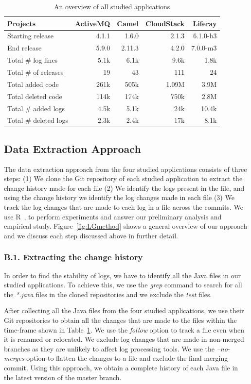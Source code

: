 \begin{table}[tb]
	\centering \protect\protect\caption{An overview of all studied applications}
	
	
	\label{tba:overviewsystems} %
	\begin{tabular}{lrrrr}
		\hline 
		Projects  & ActiveMQ  & Camel  & CloudStack  & Liferay \tabularnewline
		\hline 
		Starting release  & 4.1.1  & 1.6.0  & 2.1.3  & 6.1.0-b3 \tabularnewline
		End release  & 5.9.0  & 2.11.3  & 4.2.0  & 7.0.0-m3 \tabularnewline
		Total \# log lines  & 5.1k  & 6.1k  & 9.6k  & 1.8k \tabularnewline
		Total \# of releases  & 19  & 43  & 111  & 24 \tabularnewline
		Total added code  & 261k  & 505k  & 1.09M  & 3.9M \tabularnewline
		Total deleted code  & 114k  & 174k  & 750k  & 2.8M \tabularnewline
		Total \# added logs  & 4.5k  & 5.1k  & 24k  & 10.4k \tabularnewline
		Total \# deleted logs  & 2.3k  & 2.4k  & 17k  & 8.1k \tabularnewline
		\hline 
	\end{tabular}
\end{table}

\subsection{Data Extraction Approach}

The data extraction approach from the four studied applications consists of three steps: (1) We clone the Git repository of each studied application to extract the change history made for each file (2) We identify the logs present in the file, and using the change history we identify the log changes made in each file (3) We track the log changes that are made to each log in a file across the commits. We use R~\cite{ihaka1996r}, to perform experiments and answer our preliminary analysis and empirical study. Figure~\ref{fig:LGmethod} shows a general overview of our approach and we discuss each step discussed above in further detail. 

\subsubsection*{B.1. Extracting the change history} 
In order to find the stability of logs, we have to identify all the Java files in our studied applications. To achieve this, we use the \emph{grep} command to search for all the \emph{*.java} files in the cloned repositories and we exclude the \emph{test} files. 

After collecting all the Java files from the four studied applications, we use their Git repositories to obtain all the changes that are made to the files within the time-frame shown in Table~\ref{tba:overviewsystems}. We use the \emph{follow} option to track a file even when it is renamed or relocated. We exclude log changes that are made in non-merged branches as they are unlikely to affect log processing tools. We use the \emph{--no-merges} option to flatten the changes to a file and exclude the final merging commit. Using this approach, we obtain a complete history of each Java file in the latest version of the master branch.


